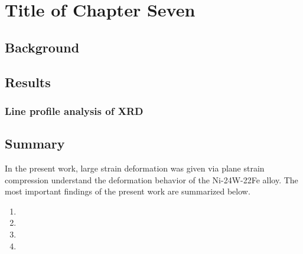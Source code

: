 
\chapter{Title of Chapter Seven}

\label{Chapter7} %


\section{Background}

\lipsum[1-2]

\section{Results}

\subsection{Line profile analysis of XRD}
\lipsum[1-2]

\section{Summary}
In the present work, large strain deformation was given via plane strain compression understand the deformation behavior of the Ni-24W-22Fe alloy. The most important findings of the present work are summarized below.
\begin{enumerate}
    \item \lipsum[1]
    
    \item \lipsum[1]
  
    \item \lipsum[1]
    
    \item \lipsum[1] 

    
\end{enumerate}